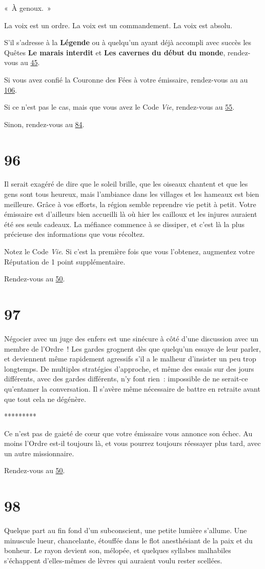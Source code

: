 \documentclass{report}
\newcommand{\gsection}[1]{
    \section{#1}
    \label{section-#1}
}
\newcommand{\glink}[1]{\hyperref[section-#1]{#1}}
\newcommand{\ellipse}{
    \begin{center}
        *********
    \end{center}
}
\newcommand{\hero}[1]{\textbf{#1}}
\begin{document}
« À genoux. »

La voix est un ordre. La voix est un commandement. La voix est absolu.

S'il s'adresse à la \hero{Légende} ou à quelqu'un ayant déjà accompli avec succès les Quêtes \textbf{Le marais interdit} et \textbf{Les cavernes du début du monde}, rendez-vous au \glink{45}.

Si vous avez confié la Couronne des Fées à votre émissaire, rendez-vous au au \glink{106}.

Si ce n'est pas le cas, mais que vous avez le Code \emph{Vie}, rendez-vous au \glink{55}.

Sinon, rendez-vous au \glink{84}.

\gsection{96}

Il serait exagéré de dire que le soleil brille, que les oiseaux chantent et que les gens sont tous heureux, mais l'ambiance dans les villages et les hameaux est bien meilleure. Grâce à vos efforts, la région semble reprendre vie petit à petit. Votre émissaire est d'ailleurs bien accueilli là où hier les cailloux et les injures auraient été ses seuls cadeaux. La méfiance commence à se dissiper, et c'est là la plus précieuse des informations que vous récoltez.

Notez le Code \emph{Vie}. Si c'est la première fois que vous l'obtenez, augmentez votre Réputation de 1 point supplémentaire.

Rendez-vous au \glink{50}.

\gsection{97}

Négocier avec un juge des enfers est une sinécure à côté d'une discussion avec un membre de l'Ordre ! Les gardes grognent dès que quelqu'un essaye de leur parler, et deviennent même rapidement agressifs s'il a le malheur d'insister un peu trop longtemps. De multiples stratégies d'approche, et même des essais sur des jours différents, avec des gardes différents, n'y font rien : impossible de ne serait-ce qu'entamer la conversation. Il s'avère même nécessaire de battre en retraite avant que tout cela ne dégénère.

\ellipse

Ce n'est pas de gaieté de cœur que votre émissaire vous annonce son échec. Au moins l'Ordre est-il toujours là, et vous pourrez toujours réessayer plus tard, avec un autre missionnaire.

Rendez-vous au \glink{50}.

\gsection{98}

Quelque part au fin fond d'un subconscient, une petite lumière s'allume. Une minuscule lueur, chancelante, étouffée dans le flot anesthésiant de la paix et du bonheur. Le rayon devient son, mélopée, et quelques syllabes malhabiles s'échappent d'elles-mêmes de lèvres qui auraient voulu rester scellées.
\end{document}
